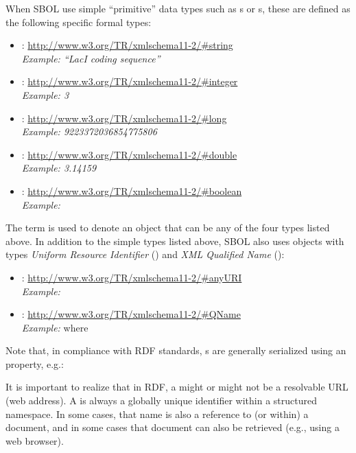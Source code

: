 When SBOL use simple ``primitive'' data types such as s or s, these are defined as the following specific formal types:
\begin{itemize}
\item {}: \url{http://www.w3.org/TR/xmlschema11-2/#string}\\
  {\em Example: ``LacI coding sequence''}
\item {}: \url{http://www.w3.org/TR/xmlschema11-2/#integer}\\
  {\em Example: 3}
\item {}: \url{http://www.w3.org/TR/xmlschema11-2/#long}\\
  {\em Example: 9223372036854775806}
\item {}: \url{http://www.w3.org/TR/xmlschema11-2/#double}\\
  {\em Example: 3.14159}
\item {}: \url{http://www.w3.org/TR/xmlschema11-2/#boolean}\\
  {\em Example: }
\end{itemize}
The term  is used to denote an object that can be any of the four types listed above.
In addition to the simple types listed above, SBOL also uses objects with types \emph{Uniform Resource Identifier} () and \emph{XML Qualified Name} ():
\begin{itemize}
\item {}: \url{http://www.w3.org/TR/xmlschema11-2/#anyURI}\\
  {\em Example: }
\item {}: \url{http://www.w3.org/TR/xmlschema11-2/#QName}\\
  {\em Example: } where  
\end{itemize}

Note that, in compliance with RDF standards, s are generally serialized using an  property, e.g.:

It is important to realize that in RDF, a  might or might not be a resolvable URL (web address).  A  is always a globally unique identifier within a structured namespace.  In some cases, that name is also a reference to (or within) a document, and in some cases that document can also be retrieved (e.g., using a web browser).

